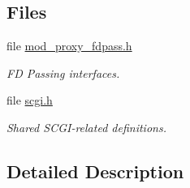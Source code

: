\subsection*{Files}
\begin{DoxyCompactItemize}
\item 
file \hyperlink{mod__proxy__fdpass_8h}{mod\+\_\+proxy\+\_\+fdpass.\+h}
\begin{DoxyCompactList}\small\item\em FD Passing interfaces. \end{DoxyCompactList}\item 
file \hyperlink{scgi_8h}{scgi.\+h}
\begin{DoxyCompactList}\small\item\em Shared S\+C\+G\+I-\/related definitions. \end{DoxyCompactList}\end{DoxyCompactItemize}


\subsection{Detailed Description}
